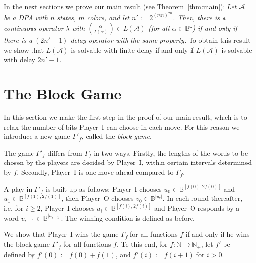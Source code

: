 \documentclass[fleqn,envcountsame]{LMCS}
\newcommand{\aut}[1]{\ensuremath{\mathcal{#1}}}
\newcommand{\pI}{Player~I\xspace}
\newcommand{\pO}{Player~O\xspace}
\newcommand{\Gd}[1]{\ensuremath{\Gamma_{#1}}\xspace}
\newcommand{\Gp}[1]{\ensuremath{\Gamma'_{#1}}\xspace}
\newcommand{\LA}{\ensuremath{L(\aut{A})}\xspace}
\newcommand{\Nat}{\ensuremath{\mathbb{N}}\xspace}
\newcommand{\Natp}{\ensuremath{\mathbb{N}_+}\xspace}
\newcommand{\B}{\ensuremath{\mathbb{B}}\xspace}
\newcommand{\Bom}{\ensuremath{\mathbb{B}^{\omega}}\xspace}
\newcommand{\al}{\ensuremath{\alpha}\xspace}
\newcommand{\ie}{i.e.\xspace}
\let\obinom\binom
\renewcommand\binom[2]{
  \Big( { {{#1}} \atop {{#2}} } \Big)
}
\begin{document}
In the next sections we prove our main result (see Theorem~\ref{thm:main}):
\emph{Let \aut{A} be a DPA
with $n$ states, $m$ colors, and let $n' := 2^{(mn)^{2n}}$.
Then, there is a continuous operator $\lambda$
with $\obinom{\al}{\lambda(\al)}\in\LA$ (for all $\al\in\Bom$)
if and only if there is a $(2n'-1)$-delay operator with the same property.}
To obtain this result we show that
\LA is solvable with finite delay
if and only if \LA is solvable with delay $2n'-1$.



\section{The Block Game}\label{sec:block_game}
In this section we make the first step in the proof of our main result,
which is to relax the number of bits \pI can choose in each move.
For this reason we introduce a new game \Gp{f}, called the \emph{block game}.

The game \Gp{f} differs from \Gd{f} in two ways.
Firstly, the lengths of the words to be chosen by the players
are decided by \pI, within certain intervals determined by $f$.
Secondly, \pI is one move ahead compared to \Gd{f}.

A play in \Gp{f} is built up as follows: \pI chooses
$u_0\in\B^{[f(0),2f(0)]}$ and $u_1\in\B^{[f(1),2f(1)]}$,
then \pO chooses $v_0\in\B^{|u_0|}$.
In each round thereafter, \ie for $i\geq2$, \pI chooses
$u_i\in\B^{[f(i),2f(i)]}$ and \pO responds
by a word $v_{i-1}\in\B^{|u_{i-1}|}$.
The winning condition is defined as before.

We show that \pI wins the game \Gd{f} for all functions $f$ if and only
if he wins the block game \Gp{f} for all functions $f$. To this end, for
$f:\Nat\to\Natp$, let $f'$ be defined by
$f'(0) := f(0)+f(1)$, and $f'(i) := f(i+1)$ for $i>0$.
\end{document}
